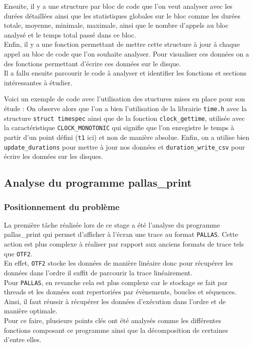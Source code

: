 Ensuite, il y a une structure par bloc de code que l'on veut analyser avec les durées détaillées ainsi que les statistiques globales sur le bloc comme les durées totale, moyenne, minimale, maximale, ainsi que 
le nombre d'appels au bloc analysé et le temps total passé dans ce bloc.\\

Enfin, il y a une fonction permettant de mettre cette structure à jour à chaque appel au bloc de code que l'on souhaite analyser.\newline
Pour visualiser ces données on a des fonctions permettant d'écrire ces données sur le disque.\\

Il a fallu ensuite parcourir le code à analyser et identifier les fonctions et sections intéressantes à étudier.

Voici un exemple de code avec l'utilisation des stuctures mises en place pour son étude :
On observe alors que l'on a bien l'utilisation de la librairie \verb!time.h! avec la structure \verb!struct timespec! ainsi que de la fonction \verb!clock_gettime!, utilisée
avec la caractéristique \verb!CLOCK_MONOTONIC! qui signifie que l'on enregistre le temps à partir d'un point défini (\verb!t1! ici) et non de manière absolue. Enfin, on a utilise bien
\verb!update_durations! pour mettre à jour nos données et \verb!duration_write_csv! pour écrire les données sur les disques.

\subsection{Analyse du programme pallas\_print}\label{ssec:pallas_print}
\subsubsection{Positionnement du problème}\label{ssec:pallas_print_pbm}

La première tâche réalisée lors de ce stage a été l'analyse du programme pallas\_print qui permet d'afficher à l'écran une trace au format \verb!PALLAS!.
Cette action est plus complexe à réaliser par rapport aux anciens formats de trace tels que \verb!OTF2!.\\
En effet, \verb!OTF2! stocke les données de manière linéaire donc pour récupérer les données dans l'ordre il suffit de parcourir la trace linéairement.\\
Pour \verb!PALLAS!, en revanche cela est plus complexe car le stockage se fait par threads et les données sont repertoriées par évènements, boucles et séquences. Ainsi, il faut réussir 
à récupérer les données d'exécution dans l'ordre et de manière optimale.\\
Pour ce faire, plusieurs points clés ont été analysés comme les différentes fonctions composant ce programme ainsi que la décomposition de certaines d'entre elles.

